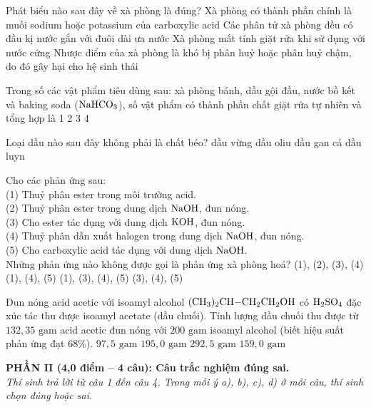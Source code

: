 \documentclass[12pt,a4paper]{article}
\begin{document}
\begin{ex}
Phát biểu nào sau đây về xà phòng là đúng?
\choice
{Xà phòng có thành phần chính là muối sodium hoặc potassium của carboxylic acid}
{Các phân tử xà phòng đều có đầu kị nước gắn với đuôi dài ưa nước}
{Xà phòng mất tính giặt rửa khi sử dụng với nước cứng}
{Nhược điểm của xà phòng là khó bị phân huỷ hoặc phân huỷ chậm, do đó gây hại cho hệ sinh thái}
\loigiai{}
\end{ex}

\begin{ex}
Trong số các vật phẩm tiêu dùng sau: xà phòng bánh, dầu gội đầu, nước bồ kết và baking soda ($\ce{NaHCO3}$), số vật phẩm có thành phần chất giặt rửa tự nhiên và tổng hợp là
\choice
{1}
{2}
{3}
{4}
\loigiai{}
\end{ex}

\begin{ex}
Loại dầu nào sau đây không phải là chất béo?
\choice
{dầu vừng}
{dầu oliu}
{dầu gan cá}
{dầu luyn}
\loigiai{}
\end{ex}

\begin{ex}
Cho các phản ứng sau:\\
(1) Thuỷ phân ester trong môi trường acid.\\
(2) Thuỷ phân ester trong dung dịch $\ce{NaOH}$, đun nóng.\\
(3) Cho ester tác dụng với dung dịch $\ce{KOH}$, đun nóng.\\
(4) Thuỷ phân dẫn xuất halogen trong dung dịch $\ce{NaOH}$, đun nóng.\\
(5) Cho carboxylic acid tác dụng với dung dịch $\ce{NaOH}$.\\
Những phản ứng nào không được gọi là phản ứng xà phòng hoá?
\choice
{(1), (2), (3), (4)}
{(1), (4), (5)}
{(1), (3), (4), (5)}
{(3), (4), (5)}
\loigiai{}
\end{ex}

\begin{ex}
Đun nóng acid acetic với isoamyl alcohol $\ce{(CH3)2CH-CH2CH2OH}$ có $\ce{H2SO4}$ đặc xúc tác thu được isoamyl acetate (dầu chuối). Tính lượng dầu chuối thu được từ $132{,}35\text{ gam}$ acid acetic đun nóng với $200\text{ gam}$ isoamyl alcohol (biết hiệu suất phản ứng đạt 68\%).
\choice
{$97{,}5\text{ gam}$}
{$195{,}0\text{ gam}$}
{$292{,}5\text{ gam}$}
{$159{,}0\text{ gam}$}
\loigiai{}
\end{ex}


\vspace{0.3cm}
\noindent
\textbf{PHẦN II (4,0 điểm -- 4 câu): Câu trắc nghiệm đúng sai.}\\
\textit{Thí sinh trả lời từ câu 1 đến câu 4. Trong mỗi ý a), b), c), d) ở mỗi câu, thí sinh chọn đúng hoặc sai.}
\end{document}
